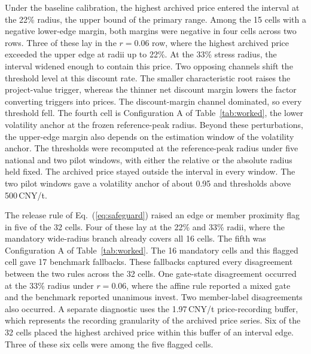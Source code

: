 \documentclass[5p,times,authoryear]{elsarticle}
\theoremstyle{plain}
\begin{document}
Under the baseline calibration, the highest archived price entered the interval at the 22\% radius, the upper bound of the primary range. Among the 15 cells with a negative lower-edge margin, both margins were negative in four cells across two rows. Three of these lay in the $r=0.06$ row, where the highest archived price exceeded the upper edge at radii up to 22\%. At the 33\% stress radius, the interval widened enough to contain this price. Two opposing channels shift the threshold level at this discount rate. The smaller characteristic root raises the project-value trigger, whereas the thinner net discount margin lowers the factor converting triggers into prices. The discount-margin channel dominated, so every threshold fell. The fourth cell is Configuration A of Table~\ref{tab:worked}, the lower volatility anchor at the frozen reference-peak radius. Beyond these perturbations, the upper-edge margin also depends on the estimation window of the volatility anchor. The thresholds were recomputed at the reference-peak radius under five national and two pilot windows, with either the relative or the absolute radius held fixed. The archived price stayed outside the interval in every window. The two pilot windows gave a volatility anchor of about 0.95 and thresholds above 500\,CNY/t.

The release rule of Eq.~(\ref{eq:safeguard}) raised an edge or member proximity flag in five of the 32 cells. Four of these lay at the 22\% and 33\% radii, where the mandatory wide-radius branch already covers all 16 cells. The fifth was Configuration A of Table~\ref{tab:worked}. The 16 mandatory cells and this flagged cell gave 17 benchmark fallbacks. These fallbacks captured every disagreement between the two rules across the 32 cells. One gate-state disagreement occurred at the 33\% radius under $r=0.06$, where the affine rule reported a mixed gate and the benchmark reported unanimous invest. Two member-label disagreements also occurred. A separate diagnostic uses the 1.97\,CNY/t price-recording buffer, which represents the recording granularity of the archived price series. Six of the 32 cells placed the highest archived price within this buffer of an interval edge. Three of these six cells were among the five flagged cells.
\end{document}

